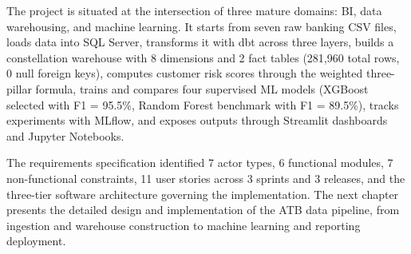 The project is situated at the intersection of three mature domains: BI, data warehousing,
and machine learning. It starts from seven raw banking CSV files, loads data into SQL Server,
transforms it with dbt across three layers, builds a constellation warehouse with 8 dimensions
and 2 fact tables (281,960 total rows, 0 null foreign keys), computes customer risk scores
through the weighted three-pillar formula, trains and compares four supervised ML models (XGBoost
selected with F1 = 95.5\%, Random Forest benchmark with F1 = 89.5\%), tracks experiments with
MLflow, and exposes outputs through Streamlit dashboards and Jupyter Notebooks.

The requirements specification identified 7 actor types, 6 functional modules, 7 non-functional
constraints, 11 user stories across 3 sprints and 3 releases, and the three-tier software
architecture governing the implementation. The next chapter presents the detailed design and
implementation of the ATB data pipeline, from ingestion and warehouse construction to machine
learning and reporting deployment.
